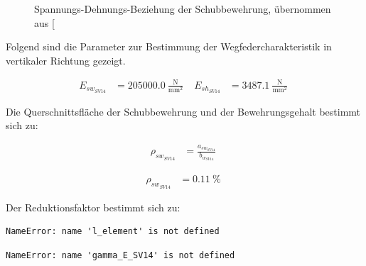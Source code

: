 \documentclass[
  11pt,
  letterpaper,
]{scrreprt}
\begin{document}
\begin{figure}[H]


\caption{\label{fig-sigma-epsilon-sv14}Spannungs-Dehnungs-Beziehung der
Schubbewehrung, übernommen aus
{[}\citeproc{ref-gitz_ansatze_2024}{1}{]}}

\end{figure}%

Folgend sind die Parameter zur Bestimmung der Wegfedercharakteristik in
vertikaler Richtung gezeigt.

$$
\begin{aligned}
E_{sw_{SV14}} &= 205000.0\ \frac{\mathrm{N}}{\mathrm{mm}^{2}} \; 
 &E_{sh_{SV14}} &= 3487.1\ \frac{\mathrm{N}}{\mathrm{mm}^{2}} \;
\end{aligned}
$$

Die Querschnittsfläche der Schubbewehrung und der Bewehrungsgehalt
bestimmt sich zu:

$$
\begin{aligned}
\rho_{sw_{SV14}} &= \frac{ a_{sw_{SV14}} }{ b_{w_{SV14}} } \; 
\end{aligned}
$$

$$
\begin{aligned}
\rho_{sw_{SV14}} &= 0.11\ \mathrm{\%} \;
\end{aligned}
$$

Der Reduktionsfaktor bestimmt sich zu:

\begin{verbatim}
NameError: name 'l_element' is not defined
\end{verbatim}

\begin{verbatim}
NameError: name 'gamma_E_SV14' is not defined
\end{verbatim}
\end{document}
